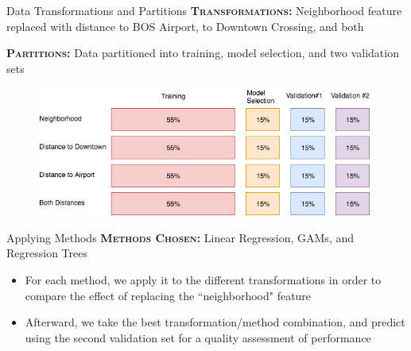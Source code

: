 \documentclass[10pt]{beamer}
\begin{document}
    \begin{frame}{Data Transformations and Partitions}
    	\textbf{\textsc{Transformations:}} Neighborhood feature replaced with distance to BOS Airport, to Downtown Crossing, and both
        
       	\textbf{\textsc{Partitions:}} Data partitioned into training, model selection, and two validation sets
        
        \begin{figure}[H]
        	\centering
        	\includegraphics[width=\textwidth]{data_separation.png}
        \end{figure}
      \end{frame}
    
    \begin{frame}{Applying Methods}
    	\textbf{\textsc{Methods Chosen:}} Linear Regression, GAMs, and Regression Trees
        \begin{itemize}
          \item For each method, we apply it to the different transformations in order to compare the effect of replacing the ``neighborhood" feature
          \item Afterward, we take the best transformation/method combination, and predict using the second validation set for a quality assessment of performance
        \end{itemize}  
    \end{frame}
    
\end{document}
